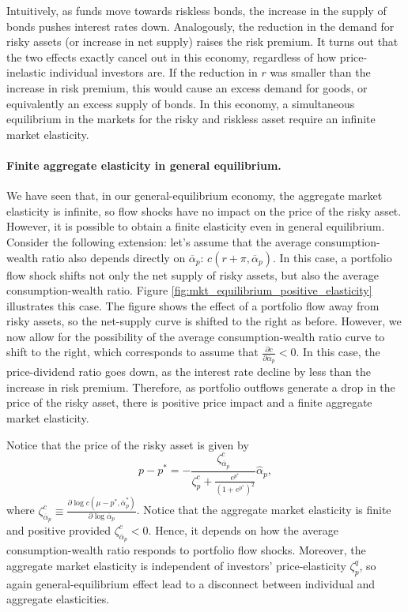 Intuitively, as funds move towards riskless bonds, the increase in the supply of bonds pushes interest rates down. 
Analogously, the reduction in the demand for risky assets (or increase in net supply) raises the risk premium. 
It turns out that the two effects exactly cancel out in this economy, regardless of how price-inelastic individual investors are. 
If the reduction in $r$ was smaller than the increase in risk premium, this would cause an excess demand for goods, or equivalently an excess supply of bonds. 
In this economy, a simultaneous equilibrium in the markets for the risky and riskless asset require an infinite market elasticity.

\paragraph{Finite aggregate elasticity in general equilibrium.} We have seen that, in our general-equilibrium economy, the aggregate market elasticity is infinite, so flow shocks have no impact on the price of the risky asset. However, it is possible to obtain a finite elasticity even in general equilibrium. Consider the following extension: let's assume that the average consumption-wealth ratio also depends directly on $\overline{\alpha}_p$: $c(r+\pi, \overline{\alpha}_p)$. 
In this case, a portfolio flow shock shifts not only the net supply of risky assets, but also the average consumption-wealth ratio. 
Figure \ref{fig:mkt_equilibrium_positive_elasticity} illustrates this case. 
The figure shows the effect of a portfolio flow away from risky assets, so the net-supply curve is shifted to the right as before. 
However, we now allow for the possibility of the average consumption-wealth ratio curve to shift to the right, which corresponds to assume that $\frac{\partial c}{\partial \overline{\alpha}_p} < 0$. 
In this case, the price-dividend ratio goes down, as the interest rate decline by less than the increase in risk premium. 
Therefore, as portfolio outflows generate a drop in the price of the risky asset, there is positive price impact and a finite aggregate market elasticity.

Notice that the price of the risky asset is given by 
\begin{equation}
    p - p^* = - \frac{\zeta^c_{\overline{\alpha}_p}}{\zeta_p^c + \frac{e^{p^*}}{(1+e^ {p^*})^2}} \hat{\alpha}_p,
\end{equation}
where $\zeta^c_{\overline{\alpha}_p} \equiv \frac{\partial \log c(\mu-p^*, \overline{\alpha}_p^*)}{\partial \log \overline{\alpha}_p}$. 
Notice that the aggregate market elasticity is finite and positive provided $\zeta^c_{\overline{\alpha}_p} < 0$. Hence, it depends on how the average consumption-wealth ratio responds to portfolio flow shocks. 
Moreover, the aggregate market elasticity is independent of investors' price-elasticity $\zeta_p^q$, so again general-equilibrium effect lead to a disconnect between individual and aggregate elasticities.

